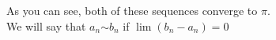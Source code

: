 \documentclass[preview]{standalone}
\begin{document}
\begin{center}
As you can see, both of these sequences converge to $\pi$.\\We will say that $a_n$$\sim$$b_n$ if $\lim (b_n - a_n) = 0$
\end{center}
\end{document}
